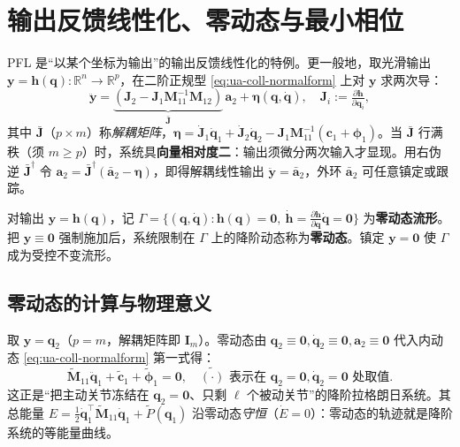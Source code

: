 \section{输出反馈线性化、零动态与最小相位}\label{sec:ua-zerodynamics}

PFL 是“以某个坐标为输出”的输出反馈线性化的特例。更一般地，取光滑输出 $\mathbf{y}=\mathbf{h}(\mathbf{q})\colon\mathbb{R}^n\to\mathbb{R}^p$，在二阶正规型 \cref{eq:ua-coll-normalform} 上对 $\mathbf{y}$ 求两次导：
\begin{equation}\label{eq:ua-yddot}
  \ddot{\mathbf{y}}=\underbrace{(\mathbf{J}_2-\mathbf{J}_1\mathbf{M}_{11}^{-1}\mathbf{M}_{12})}_{\bar{\mathbf{J}}}\,\mathbf{a}_2+\boldsymbol{\eta}(\mathbf{q},\dot{\mathbf{q}}),\quad \mathbf{J}_i:=\tfrac{\partial\mathbf{h}}{\partial\mathbf{q}_i},
\end{equation}
其中 $\bar{\mathbf{J}}$（$p\times m$）称\emph{解耦矩阵}，$\boldsymbol{\eta}=\dot{\mathbf{J}}_1\dot{\mathbf{q}}_1+\dot{\mathbf{J}}_2\dot{\mathbf{q}}_2-\mathbf{J}_1\mathbf{M}_{11}^{-1}(\mathbf{c}_1+\boldsymbol{\phi}_1)$。当 $\bar{\mathbf{J}}$ 行满秩（须 $m\ge p$）时，系统具\textbf{向量相对度二}：输出须微分两次输入才显现。用右伪逆 $\bar{\mathbf{J}}^{\dagger}$ 令 $\mathbf{a}_2=\bar{\mathbf{J}}^{\dagger}(\bar{\mathbf{a}}_2-\boldsymbol{\eta})$，即得解耦线性输出 $\ddot{\mathbf{y}}=\bar{\mathbf{a}}_2$，外环 $\bar{\mathbf{a}}_2$ 可任意镇定或跟踪。

\begin{definition}[零动态]\label{def:ua-zerodynamics}
对输出 $\mathbf{y}=\mathbf{h}(\mathbf{q})$，记 $\Gamma=\{(\mathbf{q},\dot{\mathbf{q}})\colon\mathbf{h}(\mathbf{q})=\mathbf{0},\ \dot{\mathbf{h}}=\tfrac{\partial\mathbf{h}}{\partial\mathbf{q}}\dot{\mathbf{q}}=\mathbf{0}\}$ 为\textbf{零动态流形}。把 $\mathbf{y}\equiv\mathbf{0}$ 强制施加后，系统限制在 $\Gamma$ 上的降阶动态称为\textbf{零动态}。镇定 $\mathbf{y}=\mathbf{0}$ 使 $\Gamma$ 成为受控不变流形。
\end{definition}

\subsection{零动态的计算与物理意义}\label{sec:ua-zd-compute}

取 $\mathbf{y}=\mathbf{q}_2$（$p=m$，解耦矩阵即 $\mathbf{I}_m$）。零动态由 $\mathbf{q}_2\equiv\mathbf{0},\dot{\mathbf{q}}_2\equiv\mathbf{0},\mathbf{a}_2\equiv\mathbf{0}$ 代入内动态 \cref{eq:ua-coll-normalform} 第一式得：
\begin{equation}\label{eq:ua-zd-lower}
  \tilde{\mathbf{M}}_{11}\ddot{\mathbf{q}}_1+\tilde{\mathbf{c}}_1+\tilde{\boldsymbol{\phi}}_1=\mathbf{0},\quad \tilde{(\cdot)}\text{ 表示在 }\mathbf{q}_2=\mathbf{0},\dot{\mathbf{q}}_2=\mathbf{0}\text{ 处取值}.
\end{equation}
这正是“把主动关节冻结在 $\mathbf{q}_2=\mathbf{0}$、只剩 $\ell$ 个被动关节”的降阶拉格朗日系统。其总能量 $E=\tfrac12\dot{\mathbf{q}}_1^\top\tilde{\mathbf{M}}_{11}\dot{\mathbf{q}}_1+\tilde{P}(\mathbf{q}_1)$ 沿零动态\emph{守恒}（$\dot{E}=0$）：零动态的轨迹就是降阶系统的等能量曲线。

